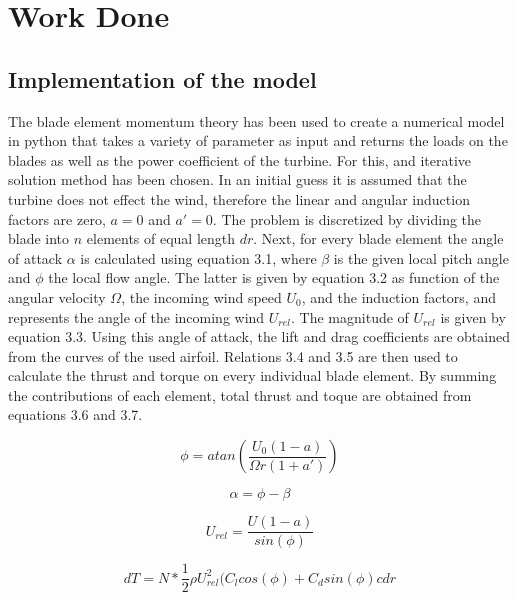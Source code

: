 \chapter{Work Done}

\section{Implementation of the model}

The blade element momentum theory has been used to create a numerical model in python that takes a variety of parameter as input and returns the loads on the blades as well as the power coefficient of the turbine. For this, and iterative solution method has been chosen. In an initial guess it is assumed that the turbine does not effect the wind, therefore the linear and angular induction factors are zero, $a=0$ and $a'=0$. The problem is discretized by dividing the blade into $n$ elements of equal length $dr$. Next, for every blade element the angle of attack $\alpha$ is calculated using equation 3.1, where $\beta$ is the given local pitch angle and $\phi$ the local flow angle. The latter is given by equation 3.2 as function of the angular velocity $\Omega$, the incoming wind speed $U_0$, and the induction factors, and represents the angle of the incoming wind $U_{rel}$. The magnitude of $U_{rel}$ is given by equation 3.3. Using this angle of attack, the lift and drag coefficients are obtained from the curves of the used airfoil. Relations 3.4 and 3.5 are then used to calculate the thrust and torque on every individual blade element. By summing the contributions of each element, total thrust and toque are obtained from equations 3.6 and 3.7.\cite{manwell2010wind}

\begin{equation}\label{key}
\phi = atan \left( \frac{U_0(1-a)}{\Omega r (1+a')} \right)
\end{equation}

\begin{equation}\label{key}
\alpha = \phi - \beta
\end{equation}

\begin{equation}\label{key}
U_{rel} = \frac{U(1-a)}{sin(\phi)}
\end{equation}

\begin{equation}\label{key}
dT = N*\frac{1}{2}\rho U^2_{rel}(C_l cos(\phi)+C_d sin(\phi)c dr
\end{equation}


